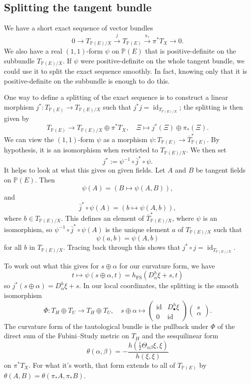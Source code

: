 \documentclass[10pt,a4paper]{article}
\newcommand{\kk}[1]{\mathbb{#1}}
\DeclareMathOperator{\id}{id}
\begin{document}
\subsection{Splitting the tangent bundle}

We have a short exact sequence of vector bundles
$$
0
\longrightarrow T_{\kk P(E) / X}
\stackrel{j}{\longrightarrow} T_{\kk P(E)}
\stackrel{\pi_*}{\longrightarrow} \pi^* T_X
\longrightarrow 0.
$$
We also have a real $(1,1)$-form $\psi$ on $\kk P(E)$ that is positive-definite on the subbundle $T_{\kk P(E)/X}$. If $\psi$ were positive-definite on the whole tangent bundle, we could use it to split the exact sequence smoothly. In fact, knowing only that it is positive-definite on the subbundle is enough to do this.

One way to define a splitting of the exact sequence is to construct a linear morphism $j^* : T_{\kk P(E)} \to T_{\kk P(E)/X}$ such that $j^* j = \id_{T_{\kk P(E)/X}}$; the splitting is then given by
$$
T_{\kk P(E)} \to T_{\kk P(E)/X} \oplus \pi^*T_X,
\quad
\Xi \mapsto j^*(\Xi) \oplus \pi_*(\Xi).
$$
We can view the $(1,1)$-form $\psi$ as a morphism $\psi : T_{\kk P(E)} \to \overline{T}_{\kk P(E)}^*$. By hypothesis, it is an isomorphism when restricted to $T_{\kk P(E)/X}$. We then set
$$
j^* := \psi^{-1} \circ \bar{j}^* \circ \psi.
$$
It helps to look at what this gives on given fields. Let $A$ and $B$ be tangent fields on $\kk P(E)$. Then
$$
\psi(A) = (B \mapsto \psi(A, B)),
$$
and
$$
\bar j^* \circ \psi(A) = (b \mapsto \psi(A, b)),
$$
where $b \in T_{\kk P(E)/X}$. This defines an element of $\overline T_{\kk P(E)/X}^*$, where $\psi$ is an isomorphism, so $\psi^{-1} \circ \bar j^* \circ \psi(A)$ is the unique element $a$ of $T_{\kk P(E)/X}$ such that
$$
\psi(a, b) = \psi(A, b)
$$
for all $b$ in $T_{\kk P(E)/X}$. Tracing back through this shows that $j^* \circ j = \id_{T_{\kk P(E)/X}}$.

To work out what this gives for $s \oplus \alpha$ for our curvature form, we have
$$
t \mapsto \psi(s \oplus \alpha, t) = h_{\mathrm{FS}}(D^h_\alpha \xi + s, t)
$$
so $j^*(s \oplus \alpha) = D^h_\alpha \xi + s$. In our local coordinates, the splitting is the smooth isomorphism
$$
\Phi: T_H \oplus T_U \to T_H \oplus T_U,
\quad
s \oplus \alpha
\mapsto
\begin{pmatrix}
  \id & D^h_\bullet \xi
  \\
  0 & \id
\end{pmatrix}
\begin{pmatrix}
  s \\ \alpha
\end{pmatrix}.
$$
The curvature form of the tautological bundle is the pullback under $\Phi$ of the direct sum of the Fubini--Study metric on $T_H$ and the sesquilinear form
$$
\theta(\alpha, \beta) = -\frac{h(\frac i2\Theta_{\alpha\beta}\xi, \xi)}{h(\xi,\xi)}
$$
on $\pi^*T_X$. For what it's worth, that form extends to all of $T_{\kk P(E)}$ by $\theta(A, B) = \theta(\pi_*A, \pi_*B)$.
\end{document}
